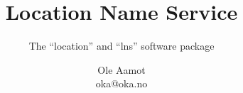 \documentclass{article}
\begin{document}
\title{Location Name Service}
\subtitle{The ``location'' and ``lns'' software package}
\author{Ole Aamot\\ oka@oka.no}
\maketitle
\end{document}

